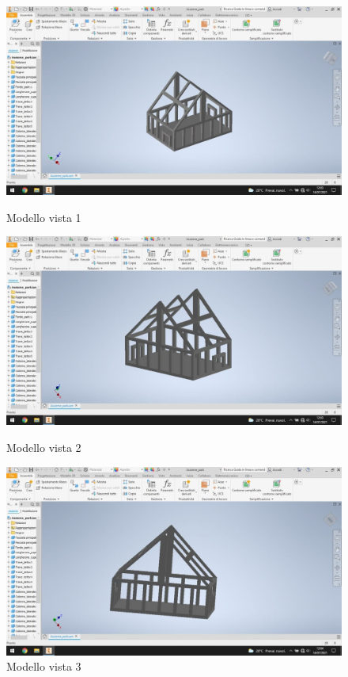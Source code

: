 \documentclass[a4paper,11pt]{report}
\begin{document}
\begin{figure}[H]
	\centering
	\begin{minipage}[b]{.90\textwidth}
		\includegraphics[width=\textwidth]{modello_1}
		\caption{Modello vista 1}
		\label{modello_1}
	\end{minipage}
	\vspace{0.5cm}
	\begin{minipage}[b]{.45\textwidth}
		\includegraphics[width=\textwidth]{modello_2}
		\caption{Modello vista 2}
		\label{modello_2}
	\end{minipage}
	\begin{minipage}[b]{.45\textwidth}
		\includegraphics[width=\textwidth]{modello_3}
		\caption{Modello vista 3}
		\label{modello_3}
	\end{minipage}
\end{figure}
\end{document}
